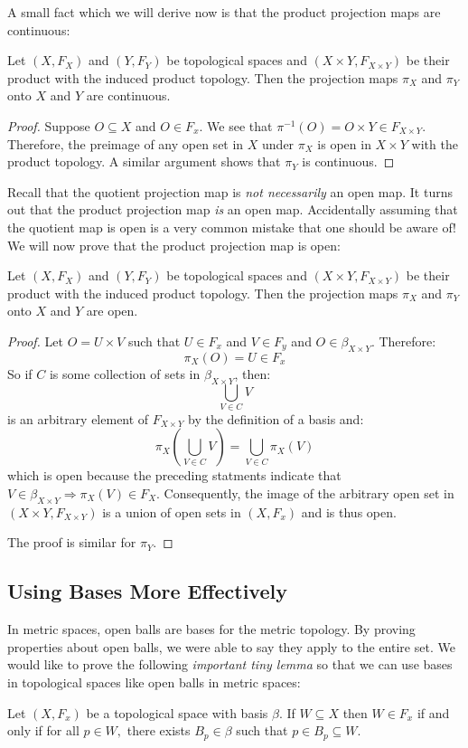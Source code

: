 A small fact which we will derive now is that the product projection maps are continuous:
\begin{theorem}
Let $(X,F_X)$ and $(Y,F_Y)$ be topological spaces and $(X\times Y,F_{X\times Y})$ be their product with the induced product topology. Then the projection maps $\pi_X$ and $\pi_Y$ onto $X$ and $Y$ are continuous. 
\end{theorem}

\begin{proof}
Suppose $O\subseteq X$ and $O\in F_x$. We see that $\pi^{-1}(O) = O\times Y \in F_{X\times Y}$. Therefore, the preimage of any open set in $X$ under $\pi_X$ is open in $X\times Y$ with the product topology. A similar argument shows that $\pi_Y$ is continuous. 
\end{proof}

Recall that the quotient projection map is \emph{not necessarily} an open map. It turns out that the product projection map \emph{is} an open map. Accidentally assuming that the quotient map is open is a very common mistake that one should be aware of! We will now prove that the product projection map is open:
\begin{theorem}
Let $(X,F_X)$ and $(Y,F_Y)$ be topological spaces and $(X\times Y,F_{X\times Y})$ be their product with the induced product topology. Then the projection maps $\pi_X$ and $\pi_Y$ onto $X$ and $Y$ are open.
\end{theorem}
\begin{proof}
Let $O = U\times V$ such that $U \in F_x$ and $V\in F_y$ and $O\in \beta_{X\times Y}$. Therefore:
\[\pi_X(O) = U\in F_x\]
So if $C$ is some collection of sets in $\beta_{X\times Y}$, then:
\[\bigcup_{V\in C}V\]
is an arbitrary element of $F_{X\times Y}$ by the definition of a basis and:
\[\pi_X\left( \bigcup_{V\in C}V \right) = \bigcup_{V\in C} \pi_X(V)\]
which is open because the preceding statments indicate that $V\in \beta_{X\times Y} \Rightarrow \pi_X(V)\in F_X$. Consequently, the image of the arbitrary open set in $(X\times Y, F_{X\times Y})$ is a union of open sets in $(X,F_x)$ and is thus open.

The proof is similar for $\pi_Y$. 
\end{proof}

\subsection{Using Bases More Effectively}

In metric spaces, open balls are bases for the metric topology. By proving properties about open balls, we were able to say they apply to the entire set. We would like to prove the following \emph{important tiny lemma} so that we can use bases in topological spaces like open balls in metric spaces:
\begin{lemma}
Let $(X,F_x)$ be a topological space with basis $\beta$. If $W\subseteq X$ then $W\in F_x$ if and only if for all $p\in W,$ there exists $B_p\in\beta$ such that $p\in B_p\subseteq W$. 
\end{lemma}

